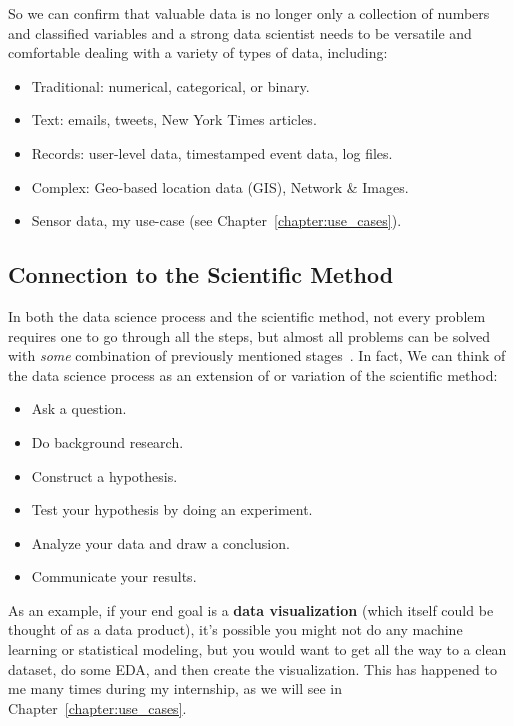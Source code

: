 So we can confirm that valuable data is no longer only a collection of numbers and classified variables and 
a strong data scientist needs to be versatile and comfortable dealing with a variety of types of data, including:
\begin{itemize}
    \item Traditional: numerical, categorical, or binary. 
    \item Text: emails, tweets, New York Times articles.
    \item Records: user-level data, timestamped event data, log files.
    \item Complex: Geo-based location data (GIS), Network \& Images.
    \item Sensor data, my use-case (see Chapter~\ref{chapter:use_cases}).
\end{itemize}

\subsection{Connection to the Scientific Method}
In both the data science process and the scientific method, not every problem requires one to go through all the steps, but almost all problems can be solved with \textit{some} combination of previously mentioned stages~\cite{Book:doing_data_science}.
In fact, We can think of the data science process as an extension of or variation of the scientific method:
\begin{itemize}
    \item Ask a question.
    \item Do background research.
    \item Construct a hypothesis.
    \item Test your hypothesis by doing an experiment.
    \item Analyze your data and draw a conclusion.
    \item Communicate your results.
\end{itemize}
As an example, if your end goal is a \textbf{data visualization} (which itself could be thought of as a data product), it’s possible you might not do any machine learning or statistical modeling,
but you would want to get all the way to a clean dataset, do some \acl{EDA}, and then create the visualization. This has happened to me many times during my internship, as we will see in Chapter~\ref{chapter:use_cases}.

